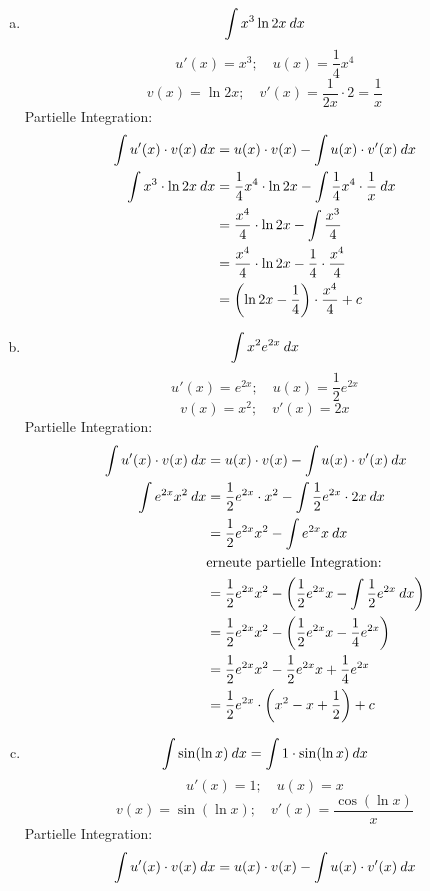\documentclass[
    10pt,
    parskip=half-,
    paper=a4,
    english,ngerman,
    fleqn,
]{scrartcl}
\begin{document}
\begin{enumerate}[a)]
\item \[ \int x^3 \ln 2x \> dx \]
    \[ u'(x) = x^3; \quad u(x) = \dfrac{1}{4} x^4 \]
    \[ v(x)  = \ln 2x; \quad v'(x) = \dfrac{1}{2x} \cdot 2 = \dfrac{1}{x}\]
    Partielle Integration:
    \begin{align*}
        \int u'(x) \cdot v(x) \> dx &=
            u(x)\cdot v(x) - \int u(x) \cdot v'(x) \> dx\\
        \int x^3 \cdot \ln 2x \> dx &=
            \dfrac{1}{4} x^4 \cdot \ln 2x -
            \int \dfrac{1}{4} x^4 \cdot \dfrac{1}{x} \> dx\\
        &= \dfrac{x^4}{4} \cdot \ln 2x - \int \dfrac{x^3}{4}\\
        &= \dfrac{x^4}{4} \cdot \ln 2x - \dfrac{1}{4} \cdot \dfrac{x^4}{4}\\
        &= \left(\ln 2x - \dfrac{1}{4}\right) \cdot \dfrac{x^4}{4} + c
    \end{align*}
\item \[ \int x^2 e^{2x} \> dx \]
    \[ u'(x) = e^{2x}; \quad u(x) = \dfrac{1}{2} e^{2x} \]
    \[ v(x) = x^2; \quad v'(x) = 2x \]
    Partielle Integration:
    \begin{align*}
        \int u'(x) \cdot v(x) \> dx &=
         u(x)\cdot v(x) - \int u(x) \cdot v'(x) \> dx\\
        \int e^{2x} x^2 \> dx &= \dfrac{1}{2} e^{2x} \cdot x^2 -
            \int \dfrac{1}{2} e^{2x} \cdot 2x \> dx\\
        &= \dfrac{1}{2} e^{2x} x^2 - \int e^{2x}x \> dx\\
        &\text{erneute partielle Integration:}\\
        &= \dfrac{1}{2}e^{2x}x^2-\left(\dfrac{1}{2}e^{2x}x-\int\dfrac{1}{2}e^{2x}\> dx\right)\\
        &= \dfrac{1}{2}e^{2x}x^2-\left(\dfrac{1}{2}e^{2x}x-\dfrac{1}{4}e^{2x}\right)\\
        &= \dfrac{1}{2}e^{2x}x^2-\dfrac{1}{2}e^{2x}x+\dfrac{1}{4}e^{2x}\\
        &= \dfrac{1}{2}e^{2x} \cdot \left(x^2 - x + \dfrac{1}{2}\right) + c
    \end{align*}
\item \[ \int \sin (\ln x) \> dx = \int 1 \cdot \sin (\ln x) \> dx\]
    \[ u'(x) = 1; \quad u(x) = x \]
    \[ v(x) = \sin(\ln x); \quad v'(x) = \dfrac{\cos(\ln x)}{x} \]
    Partielle Integration:
    \begin{align*}
        \int u'(x) \cdot v(x) \dx &=
            u(x)\cdot v(x) - \int u(x) \cdot v'(x) \dx\\

\end{align*}
\end{enumerate}
\end{document}

